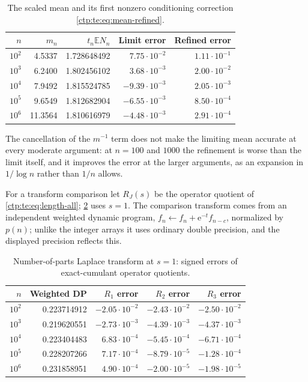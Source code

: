 \documentclass[11pt,a4paper]{article}
\numberwithin{equation}{section}
\theoremstyle{definition}
\theoremstyle{remark}
\newcommand{\e}{\mathrm e}
\newcommand{\E}{\mathbb E}
\begin{document}
\begin{table}[htbp]
\centering\small
\caption{The scaled mean and its first nonzero conditioning correction
\eqref{ctp:te:eq:mean-refined}.}
\label{ctp:te:tab:mean}
\begin{tabular}{rrrrr}
\toprule
$n$ & $m_n$ & $t_n\E N_n$ & Limit error & Refined error\\
\midrule
$10^{2}$ & 4.5337 & 1.728648492 & $7.75\cdot10^{-2}$ & $1.11\cdot10^{-1}$\\
$10^{3}$ & 6.2400 & 1.802456102 & $3.68\cdot10^{-3}$ & $2.00\cdot10^{-2}$\\
$10^{4}$ & 7.9492 & 1.815524785 & $-9.39\cdot10^{-3}$ & $2.05\cdot10^{-3}$\\
$10^{5}$ & 9.6549 & 1.812682904 & $-6.55\cdot10^{-3}$ & $8.50\cdot10^{-4}$\\
$10^{6}$ & 11.3564 & 1.810616979 & $-4.48\cdot10^{-3}$ & $2.91\cdot10^{-4}$\\
\bottomrule
\end{tabular}
\end{table}

The cancellation of the $m^{-1}$ term does not make the limiting mean
accurate at every moderate argument: at $n=100$ and $1000$ the refinement is
worse than the limit itself, and it improves the error at the larger
arguments, as an expansion in $1/\log n$ rather than $1/n$ allows.

For a transform comparison let $R_J(s)$ be the operator quotient of
\eqref{ctp:te:eq:length-all}; \cref{ctp:te:tab:laplace} uses $s=1$. The
comparison transform comes from an independent weighted dynamic program,
$f_n\gets f_n+\e^{-t}f_{n-c}$, normalized by $p(n)$; unlike the integer
arrays it uses ordinary double precision, and the displayed precision
reflects this.

\begin{table}[htbp]
\centering\small
\caption{Number-of-parts Laplace transform at $s=1$: signed errors of
exact-cumulant operator quotients.}
\label{ctp:te:tab:laplace}
\begin{tabular}{rrrrr}
\toprule
$n$ & Weighted DP & $R_1$ error & $R_2$ error & $R_3$ error\\
\midrule
$10^{2}$ & 0.223714912 & $-2.05\cdot10^{-2}$ & $-2.43\cdot10^{-2}$ & $-2.50\cdot10^{-2}$\\
$10^{3}$ & 0.219620551 & $-2.73\cdot10^{-3}$ & $-4.39\cdot10^{-3}$ & $-4.37\cdot10^{-3}$\\
$10^{4}$ & 0.223404483 & $6.83\cdot10^{-4}$ & $-5.45\cdot10^{-4}$ & $-6.71\cdot10^{-4}$\\
$10^{5}$ & 0.228207266 & $7.17\cdot10^{-4}$ & $-8.79\cdot10^{-5}$ & $-1.28\cdot10^{-4}$\\
$10^{6}$ & 0.231858951 & $4.90\cdot10^{-4}$ & $-2.00\cdot10^{-5}$ & $-1.98\cdot10^{-5}$\\
\bottomrule
\end{tabular}
\end{table}
\end{document}
